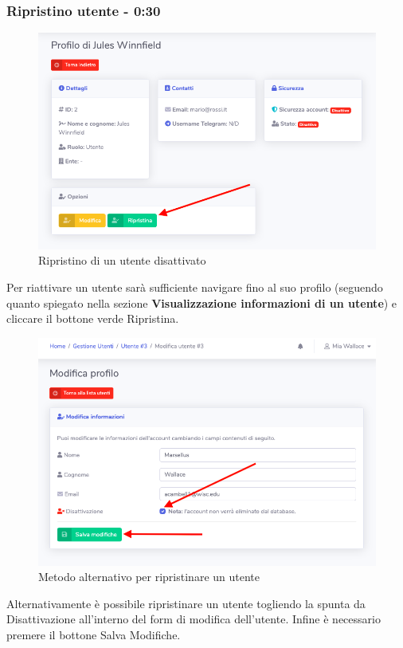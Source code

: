 	\subsubsection{Ripristino utente - 0:30}
		\begin{figure}[H]
		\centering
		\includegraphics[scale=0.600]{res/images/mod/ripristUtente.png}
		\caption{Ripristino di un utente disattivato}
	\end{figure}
		Per riattivare un utente sarà sufficiente navigare fino al suo profilo (seguendo quanto spiegato nella sezione \textbf{Visualizzazione informazioni di un utente}) e cliccare il bottone verde Ripristina.
		\begin{figure}[H]
		\centering
		\includegraphics[scale=0.600]{res/images/mod/ripristUtente1.png}
		\caption{Metodo alternativo per ripristinare un utente}
	\end{figure}
		Alternativamente è possibile ripristinare un utente togliendo la spunta da Disattivazione all'interno del form di modifica dell'utente. Infine è necessario premere il bottone Salva Modifiche.


